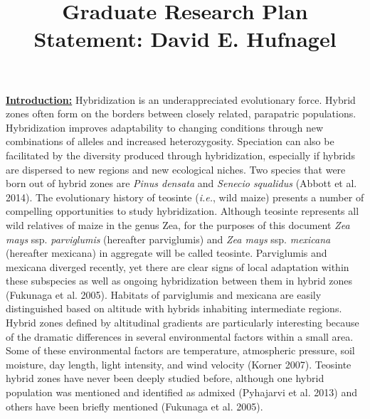 \documentclass[12pt]{amsart}
\title{Graduate Research Plan Statement: David E. Hufnagel}
\begin{document}
\maketitle

\textbf{\underline{Introduction:} }
Hybridization is an underappreciated evolutionary force.
Hybrid zones often form on the borders between closely related, parapatric populations. %
Hybridization improves adaptability to changing conditions through new combinations of alleles and increased heterozygosity.
Speciation can also be facilitated by the diversity produced through hybridization, especially if hybrids are dispersed to new regions and new ecological niches.
Two species that were born out of hybrid zones are \textit{Pinus densata} and \textit{Senecio squalidus} (Abbott et al. 2014).
The evolutionary history of teosinte (\emph{i.e.}, wild maize) presents a number of compelling opportunities to study hybridization.
Although teosinte represents all wild relatives of maize in the genus {Zea}, for the purposes of this document \textit{Zea mays} ssp. \textit{parviglumis} (hereafter parviglumis) and \textit{Zea mays} ssp. \textit{mexicana} (hereafter mexicana) in aggregate will be called teosinte. 
Parviglumis and mexicana diverged recently, yet there are clear signs of local adaptation within these subspecies as well as ongoing hybridization between them in hybrid zones (Fukunaga et al. 2005).
Habitats of parviglumis and mexicana are easily distinguished based on altitude with hybrids inhabiting intermediate regions.
Hybrid zones defined by altitudinal gradients are particularly interesting because of the dramatic differences in several environmental factors within a small area.
Some of these environmental factors are temperature, atmospheric pressure, soil moisture, day length, light intensity, and wind velocity (Korner 2007).
Teosinte hybrid zones have never been deeply studied before, although one hybrid population was mentioned and identified as admixed (Pyhajarvi et al. 2013)  and others have been briefly mentioned (Fukunaga et al. 2005).
\end{document}
